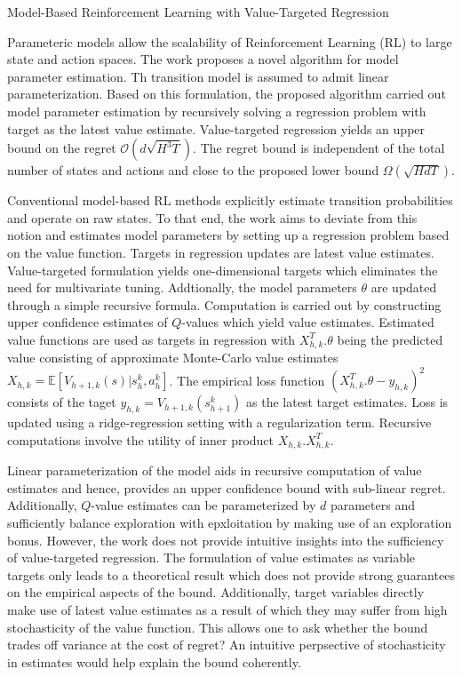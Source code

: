 \documentclass[11pt,letterpaper]{article}
\begin{document}
\begin{center}
  \large{Model-Based Reinforcement Learning with Value-Targeted Regression}
\end{center}

Parameteric models allow the scalability of Reinforcement Learning (RL) to large state and action spaces. The work proposes a novel algorithm for model parameter estimation. Th transition model is assumed to admit linear parameterization. Based on this formulation, the proposed algorithm carried out model parameter estimation by recursively solving a regression problem with target as the latest value estimate. Value-targeted regression yields an upper bound on the regret $\mathcal{O}(d\sqrt{H^{3}T})$. The regret bound is independent of the total number of states and actions and close to the proposed lower bound $\Omega(\sqrt{HdT})$.

Conventional model-based RL methods explicitly estimate transition probabilities and operate on raw states. To that end, the work aims to deviate from this notion and estimates model parameters by setting up a regression problem based on the value function. Targets in regression updates are latest value estimates. Value-targeted formulation yields one-dimensional targets which eliminates the need for multivariate tuning. Addtionally, the model parameters $\theta$ are updated through a simple recursive formula. Computation is carried out by constructing upper confidence estimates of $Q$-values which yield value estimates. Estimated value functions are used as targets in regression with $X_{h,k}^T.\theta$ being the predicted value consisting of approximate Monte-Carlo value estimates $X_{h,k} = \mathbb{E}[V_{h+1,k}(s)|s_{h}^{k},a_{h}^{k}]$. The empirical loss function $(X_{h,k}^{T}.\theta - y_{h,k})^{2}$ consists of the taget $y_{h,k} = V_{h+1,k}(s_{h+1}^{k})$ as the latest target estimates. Loss is updated using a ridge-regression setting with a regularization term. Recursive computations involve the utility of inner product $X_{h,k}.X_{h,k}^{T}$. 

Linear parameterization of the model aids in recursive computation of value estimates and hence, provides an upper confidence bound with sub-linear regret. Additionally, $Q$-value estimates can be parameterized by $d$ parameters and sufficiently balance exploration with epxloitation by making use of an exploration bonus. However, the work does not provide intuitive insights into the sufficiency of value-targeted regression. The formulation of value estimates as variable targets only leads to a theoretical result which does not provide strong guarantees on the empirical aspects of the bound. Additionally, target variables directly make use of latest value estimates as a result of which they may suffer from high stochasticity of the value function. This allows one to ask whether the bound trades off variance at the cost of regret? An intuitive perpsective of stochasticity in estimates would help explain the bound coherently.
\end{document}
